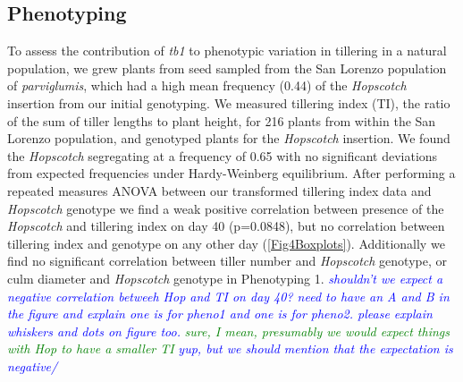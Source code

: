 \documentclass[11pt]{article}
\newcommand{\jri}[1]{\textcolor{blue}{ \emph{\scriptsize  #1}} }
\newcommand{\lev}[1]{\textcolor{green}{\emph{\scriptsize #1}} }
\begin{document}
\begin{linenumbers}
\begin{flushleft}
\subsection*{Phenotyping}

To assess the contribution of \emph{tb1} to phenotypic variation in tillering in a natural population, we grew plants from seed sampled from the San Lorenzo population of \emph{parviglumis}, which had a high mean frequency (0.44) of the \emph{Hopscotch} insertion from our initial genotyping. We measured tillering index (TI), the ratio of the sum of tiller lengths to plant height, for 216 plants from within the San Lorenzo population, and genotyped plants for the \emph{Hopscotch} insertion. We found the \emph{Hopscotch} segregating at a frequency of 0.65 with no significant deviations from expected frequencies under Hardy-Weinberg equilibrium. After performing a repeated measures ANOVA between our transformed tillering index data and \emph{Hopscotch} genotype we find a weak positive correlation between presence of the \emph{Hopscotch} and tillering index on day 40 (p=0.0848), but no correlation between tillering index and genotype on any other day (\ref{Fig4Boxplots}). Additionally we find no significant correlation between tiller number and \emph{Hopscotch} genotype, or culm diameter and \emph{Hopscotch} genotype in Phenotyping 1. \jri{shouldn't we expect a negative correlation betweeh Hop and TI on day 40? need to have an A and B in the figure and explain one is for pheno1 and one is for pheno2. please explain whiskers and dots on figure too.} \lev{sure, I mean, presumably we would expect things with Hop to have a smaller TI} \jri{yup, but we should mention that the expectation is negative/}


\end{flushleft}
\end{linenumbers}
\end{document}
